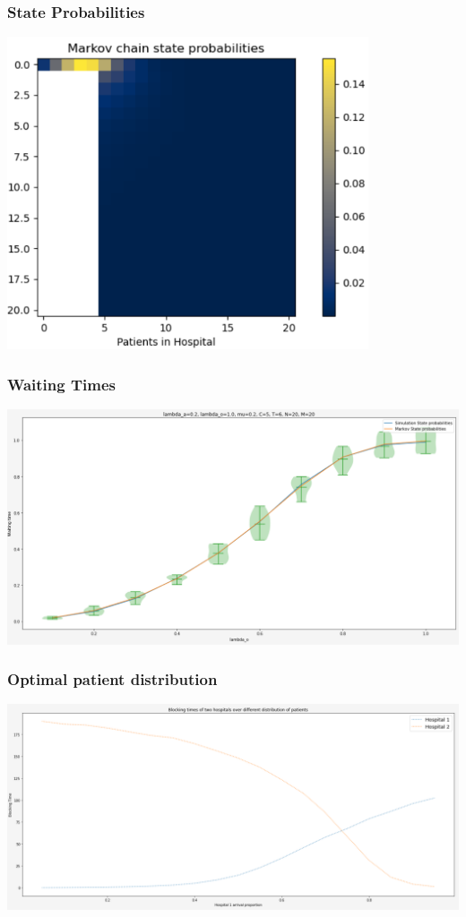 \begin{frame}
    \frametitle{State Probabilities}

    \centering
    \includegraphics[width=0.8\textwidth]{Bin/example_heatmap.png}
\end{frame}


\begin{frame}
    \frametitle{Waiting Times}

    \centering
    \includegraphics[width=\textwidth]{Bin/waiting_times.png}
\end{frame}


\begin{frame}
    \frametitle{Optimal patient distribution}

    \centering
    \includegraphics[width=\textwidth]{Bin/optimal_blocking_times.png}
\end{frame}


